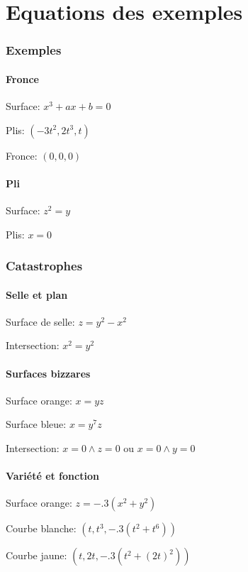 \documentclass[a4paper]{article}
\begin{document}
\part*{Equations des exemples}

\section{Exemples}

\subsection{Fronce}

Surface: $x^3 + ax + b = 0$

Plis: $(-3 t^2, 2 t^3, t)$

Fronce: $(0,0,0)$

\subsection{Pli}

Surface: $z^2 = y$

Plis: $x=0$

\section{Catastrophes}

\subsection{Selle et plan}

Surface de selle: $z=y^2-x^2$

Intersection: $x^2 = y^2$

\subsection{Surfaces bizzares}

Surface orange: $x=yz$

Surface bleue: $x=y^7z$

Intersection: $x=0 \wedge z = 0$ ou $x=0 \wedge y=0$

\subsection{Variété et fonction}

Surface orange: $z=-.3(x^2+y^2)$

Courbe blanche: $\left(t, t^3, -.3(t^2+t^6)\right)$

Courbe jaune: $\left(t, 2t, -.3(t^2 + (2t)^2)\right)$
\end{document}
